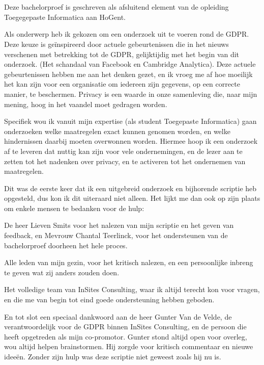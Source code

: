
\chapter*{}
\label{ch:voorwoord}

Deze bachelorproef is geschreven als afsluitend element van de opleiding Toegegepaste Informatica aan HoGent. 

Als onderwerp heb ik gekozen om een onderzoek uit te voeren rond de GDPR. Deze keuze is geïnspireerd door actuele gebeurtenissen
die in het nieuws verschenen met betrekking tot de GDPR, gelijktijdig met het begin van dit onderzoek. (Het schandaal van Facebook en Cambridge Analytica). Deze actuele gebeurtenissen hebben me aan het denken gezet, en ik vroeg me af hoe moeilijk het kan zijn voor een organisatie om iedereen zijn gegevens, op een correcte manier, te beschermen. Privacy is een waarde in onze samenleving die, naar mijn mening, hoog in het vaandel moet gedragen worden. 

Specifiek wou ik vanuit mijn expertise (als student Toegepaste Informatica) gaan onderzoeken welke maatregelen exact kunnen genomen worden, en welke hindernissen daarbij moeten overwonnen worden. 
Hiermee hoop ik een onderzoek af te leveren dat nuttig kan zijn voor vele ondernemingen, en de lezer aan te zetten tot het nadenken over privacy, en te activeren tot het ondernemen van maatregelen. 
 
Dit was de eerste keer dat ik een uitgebreid onderzoek en bijhorende scriptie heb opgesteld, dus kon ik dit uiteraard niet alleen. Het lijkt me dan ook op zijn plaats om enkele mensen te bedanken voor de hulp:

De heer Lieven Smits voor het nalezen van mijn scriptie en het geven van feedback, en Mevrouw Chantal Teerlinck, voor het ondersteunen van de bachelorproef doorheen het hele proces. 

Alle leden van mijn gezin, voor het kritisch nalezen, en een persoonlijke inbreng te geven wat zij anders zouden doen. 

Het volledige team van InSites Consulting, waar ik altijd terecht kon voor vragen, en die me van begin tot eind goede ondersteuning hebben geboden. 

En tot slot een speciaal dankwoord aan de heer Gunter Van de Velde, de verantwoordelijk voor de GDPR binnen InSites Consulting, en de persoon die heeft opgetreden als mijn co-promotor. Gunter stond altijd open voor overleg, wou altijd helpen brainstormen. Hij zorgde voor kritisch commentaar en nieuwe ideeën. Zonder zijn hulp was deze scriptie niet geweest zoals hij nu is. 



